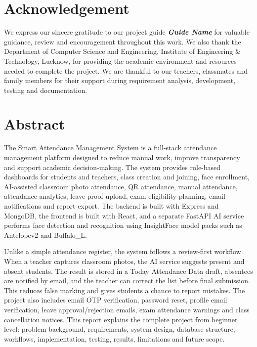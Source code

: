 \documentclass[12pt,a4paper,oneside]{report}
\newcommand{\projecttitle}{Smart Attendance Management System}
\newcommand{\placeholder}[1]{\textbf{\textit{#1}}}
\begin{document}
\chapter*{Acknowledgement}
We express our sincere gratitude to our project guide \placeholder{Guide Name} for valuable guidance, review and encouragement throughout this work. We also thank the Department of Computer Science and Engineering, Institute of Engineering \& Technology, Lucknow, for providing the academic environment and resources needed to complete the project. We are thankful to our teachers, classmates and family members for their support during requirement analysis, development, testing and documentation.

\chapter*{Abstract}
The \projecttitle{} is a full-stack attendance management platform designed to reduce manual work, improve transparency and support academic decision-making. The system provides role-based dashboards for students and teachers, class creation and joining, face enrollment, AI-assisted classroom photo attendance, QR attendance, manual attendance, attendance analytics, leave proof upload, exam eligibility planning, email notifications and report export. The backend is built with Express and MongoDB, the frontend is built with React, and a separate FastAPI AI service performs face detection and recognition using InsightFace model packs such as Antelopev2 and Buffalo\_L.

Unlike a simple attendance register, the system follows a review-first workflow. When a teacher captures classroom photos, the AI service suggests present and absent students. The result is stored in a Today Attendance Data draft, absentees are notified by email, and the teacher can correct the list before final submission. This reduces false marking and gives students a chance to report mistakes. The project also includes email OTP verification, password reset, profile email verification, leave approval/rejection emails, exam attendance warnings and class cancellation notices. This report explains the complete project from beginner level: problem background, requirements, system design, database structure, workflows, implementation, testing, results, limitations and future scope.

\tableofcontents
\listoffigures
\listoftables
\clearpage
{}
\end{document}

